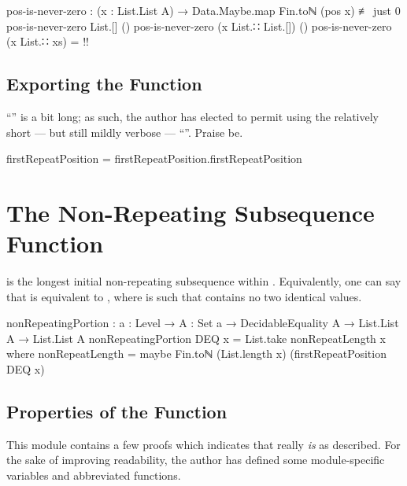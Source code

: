 \documentclass{report}
\begin{document}
\begin{code}
    pos-is-never-zero :
      (x : List.List A) →
      Data.Maybe.map Fin.toℕ (pos x) ≢ just 0
    pos-is-never-zero List.[] ()
    pos-is-never-zero (x List.∷ List.[]) ()
    pos-is-never-zero (x List.∷ xs) = {!!}
\end{code}

\subsection{Exporting the Function}
``'' is a bit long; as such, the author has elected to permit using the relatively short --- but still mildly verbose --- ``''.  Praise be.

\begin{code}
firstRepeatPosition = firstRepeatPosition.firstRepeatPosition
\end{code}

\section{The Non-Repeating Subsequence Function}
   is the longest initial non-repeating subsequence within .  Equivalently, one can say that    is equivalent to   , where  is such that    contains no two identical values.

\begin{code}
nonRepeatingPortion : {a : Level} →
                      {A : Set a} →
                      DecidableEquality A →
                      List.List A →
                      List.List A
nonRepeatingPortion DEQ x = List.take nonRepeatLength x
  where nonRepeatLength = maybe Fin.toℕ (List.length x) (firstRepeatPosition DEQ x)
\end{code}

\subsection{Properties of the Function}
This module contains a few proofs which indicates that  really \emph{is} as described.  For the sake of improving readability, the author has defined some module-specific variables and abbreviated functions.
\end{document}
